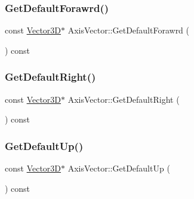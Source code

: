 \subsubsection{\texorpdfstring{Get\+Default\+Forawrd()}{GetDefaultForawrd()}}
{\footnotesize\ttfamily const \mbox{\hyperlink{class_vector3_d}{Vector3D}}$\ast$ Axis\+Vector\+::\+Get\+Default\+Forawrd (\begin{DoxyParamCaption}{ }\end{DoxyParamCaption}) const\hspace{0.3cm}{\ttfamily [inline]}}

\mbox{\label{class_axis_vector_aacf0879e0b9ace6cfbd29c8a300cd960}} 
\subsubsection{\texorpdfstring{Get\+Default\+Right()}{GetDefaultRight()}}
{\footnotesize\ttfamily const \mbox{\hyperlink{class_vector3_d}{Vector3D}}$\ast$ Axis\+Vector\+::\+Get\+Default\+Right (\begin{DoxyParamCaption}{ }\end{DoxyParamCaption}) const\hspace{0.3cm}{\ttfamily [inline]}}

\mbox{\label{class_axis_vector_a32f68ef0864e7b589d3c1996a61e11fc}} 
\subsubsection{\texorpdfstring{Get\+Default\+Up()}{GetDefaultUp()}}
{\footnotesize\ttfamily const \mbox{\hyperlink{class_vector3_d}{Vector3D}}$\ast$ Axis\+Vector\+::\+Get\+Default\+Up (\begin{DoxyParamCaption}{ }\end{DoxyParamCaption}) const\hspace{0.3cm}{\ttfamily [inline]}}

\mbox{\label{class_axis_vector_a79013d5b090ce9232d57f528f18e982e}} 
